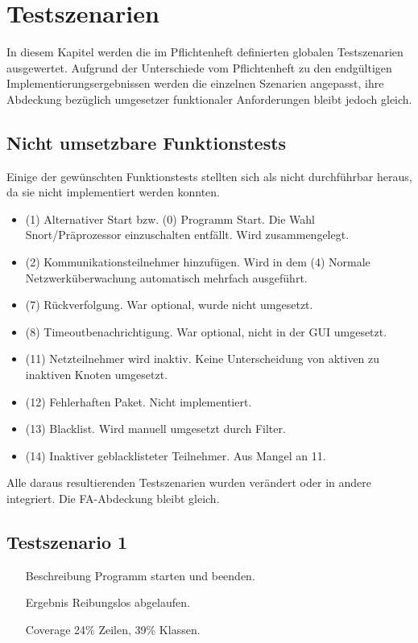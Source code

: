 \chapter{Testszenarien}

In diesem Kapitel werden die im Pflichtenheft definierten globalen Testszenarien ausgewertet. Aufgrund der Unterschiede vom Pflichtenheft zu den endgültigen Implementierungsergebnissen werden die einzelnen Szenarien angepasst, ihre Abdeckung bezüglich umgesetzer funktionaler Anforderungen bleibt jedoch gleich.

\section{Nicht umsetzbare Funktionstests}

Einige der gewünschten Funktionstests stellten sich als nicht durchführbar heraus, da sie nicht implementiert werden konnten.

\begin{itemize}
  \item (1)  Alternativer Start bzw. (0) Programm Start. Die Wahl Snort/Präprozessor einzuschalten entfällt. Wird zusammengelegt.
  \item (2)  Kommunikationsteilnehmer hinzufügen. Wird in dem (4) Normale Netzwerküberwachung automatisch mehrfach ausgeführt.
  \item (7)  Rückverfolgung. War optional, wurde nicht umgesetzt.
  \item (8)  Timeoutbenachrichtigung. War optional, nicht in der GUI umgesetzt.
  \item (11) Netzteilnehmer wird inaktiv. Keine Unterscheidung von aktiven zu inaktiven Knoten umgesetzt.
  \item (12) Fehlerhaften Paket. Nicht implementiert.
  \item (13) Blacklist. Wird manuell umgesetzt durch Filter.
  \item (14) Inaktiver geblacklisteter Teilnehmer. Aus Mangel an 11.
\end{itemize}

Alle daraus resultierenden Testszenarien wurden verändert oder in andere integriert. Die FA-Abdeckung bleibt gleich.

\section{Testszenario 1}

\begin{enumerate}[leftmargin = *, align=parleft, labelsep=3cm]
  \item[Beschreibung] Programm starten und beenden.
  \item[Ergebnis] Reibungslos abgelaufen.
  \item[Coverage] 24\% Zeilen, 39\% Klassen.
\end{enumerate}

